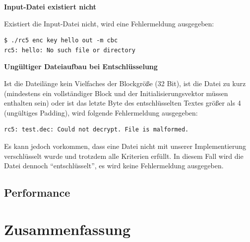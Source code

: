\documentclass[course=erap]{aspdoc}
\begin{document}
\noindent \textbf{Input-Datei existiert nicht} \bigbreak

\noindent Existiert die Input-Datei nicht, wird eine Fehlermeldung ausgegeben:
\begin{verbatim}
$ ./rc5 enc key hello out -m cbc
rc5: hello: No such file or directory
\end{verbatim}\bigbreak

\noindent \textbf{Ungültiger Dateiaufbau bei Entschlüsselung} \bigbreak

\noindent Ist die Dateilänge kein Vielfaches der Blockgröße (32 Bit), ist die Datei zu kurz (mindestens ein vollständiger Block und der Initialisierungsvektor müssen enthalten sein) oder ist das letzte Byte des entschlüsselten Textes größer als 4 (ungültiges Padding), wird folgende Fehlermeldung ausgegeben:
\begin{verbatim}
rc5: test.dec: Could not decrypt. File is malformed.
\end{verbatim}

Es kann jedoch vorkommen, dass eine Datei nicht mit unserer Implementierung verschlüsselt wurde und trotzdem alle Kriterien erfüllt. In diesem Fall wird die Datei dennoch ``entschlüsselt'', es wird keine Fehlermeldung ausgegeben.

\subsection{Performance}

\section{Zusammenfassung}

\printbibliography
\end{document}
